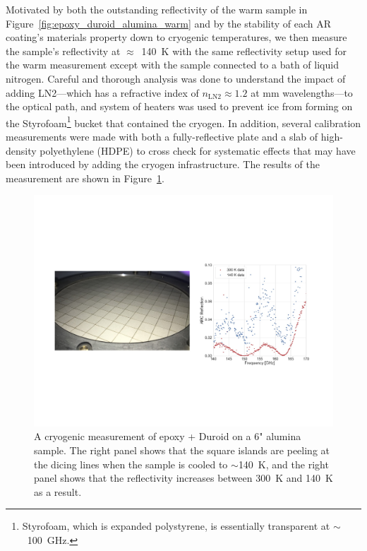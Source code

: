 Motivated by both the outstanding reflectivity of the warm sample in Figure~\ref{fig:epoxy_duroid_alumina_warm} and by the stability of each AR coating's materials property down to cryogenic temperatures, we then measure the sample's reflectivity at $\approx$~140~K with the same reflectivity setup used for the warm measurement except with the sample connected to a bath of liquid nitrogen. Careful and thorough analysis was done to understand the impact of adding LN2---which has a refractive index of $n_{\mathrm{LN2}} \approx 1.2$ at mm wavelengths---to the optical path, and system of heaters was used to prevent ice from forming on the Styrofoam\footnote{Styrofoam, which is expanded polystyrene, is essentially transparent at $\sim$~100~GHz.} bucket that contained the cryogen. In addition, several calibration measurements were made with both a fully-reflective plate and a slab of high-density polyethylene (HDPE) to cross check for systematic effects that may have been introduced by adding the cryogen infrastructure. The results of the measurement are shown in Figure~\ref{fig:epoxy_duroid_alumina_cold}.

\begin{figure}[!t]
    \centering
    \includegraphics[width=\linewidth, trim=2cm 5.5cm 2cm 5.5cm, clip]{ARCoating/Figures/epoxy_duroid_on_alumina_cold.pdf}
    \caption[A cryogenic measurement of epoxy + Duroid on a 6" alumina sample.]{A cryogenic measurement of epoxy + Duroid on a 6" alumina sample. The right panel shows that the square islands are peeling at the dicing lines when the sample is cooled to $\sim$140~K, and the right panel shows that the reflectivity increases between 300~K and 140~K as a result.}
    \label{fig:epoxy_duroid_alumina_cold}
\end{figure}

